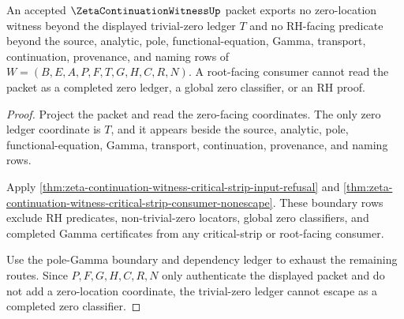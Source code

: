\begin{theorem}
\label{thm:zeta-continuation-witness-zero-ledger-nonescape}
An accepted $\ZetaContinuationWitnessUp$ packet exports no zero-location witness beyond the displayed trivial-zero ledger $T$ and no RH-facing predicate beyond the source, analytic, pole, functional-equation, Gamma, transport, continuation, provenance, and naming rows of $W=(B,E,A,P,F,T,G,H,C,R,N)$. A root-facing consumer cannot read the packet as a completed zero ledger, a global zero classifier, or an RH proof.
\end{theorem}
\begin{proof}
Project the packet and read the zero-facing coordinates. The only zero ledger coordinate is $T$, and it appears beside the source, analytic, pole, functional-equation, Gamma, transport, continuation, provenance, and naming rows.

Apply \autoref{thm:zeta-continuation-witness-critical-strip-input-refusal} and \autoref{thm:zeta-continuation-witness-critical-strip-consumer-nonescape}. These boundary rows exclude RH predicates, non-trivial-zero locators, global zero classifiers, and completed Gamma certificates from any critical-strip or root-facing consumer.

Use the pole-Gamma boundary and dependency ledger to exhaust the remaining routes. Since $P,F,G,H,C,R,N$ only authenticate the displayed packet and do not add a zero-location coordinate, the trivial-zero ledger cannot escape as a completed zero classifier.
\end{proof}

